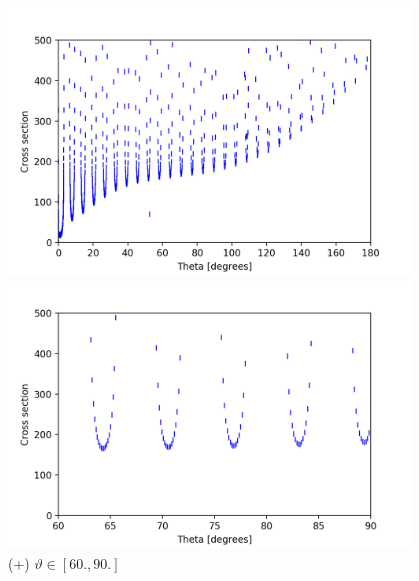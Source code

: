 \documentclass[a4paper,12pt]{article}
\begin{document}
\begin{figure}[H]
	\centering
	\begin{minipage}{0.5\textwidth}
		\centering
		\includegraphics[width=0.95\textwidth]{./cross-pot-og1.png}
		\caption{ (+) $\vartheta \in [0., 180.]$ }
	\end{minipage}\hfill
	\begin{minipage}{0.5\textwidth}
		\centering
		\includegraphics[width=0.95\textwidth]{./cross-pot-og2.png}
		\caption{ (+) $\vartheta \in [60., 90.]$}
	\end{minipage}
\end{figure}
\end{document}
